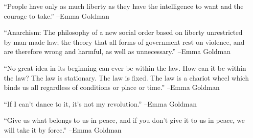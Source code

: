 \documentclass{article}%
\begin{document}
\linebreak%
\vspace{1mm}%
\begin{minipage}{\textwidth}%
\flushleft%
“People have only as much liberty as they have the intelligence to want and the courage to take.”%
\linebreak%
\vspace{1mm}%
–Emma Goldman%
\linebreak%
\vspace{1mm}%
\end{minipage}%
\linebreak%
\vspace{1mm}%
\begin{minipage}{\textwidth}%
\flushleft%
“Anarchism: The philosophy of a new social order based on liberty unrestricted by man{-}made law; the theory that all forms of government rest on violence, and are therefore wrong and harmful, as well as unnecessary.”%
\linebreak%
\vspace{1mm}%
–Emma Goldman%
\linebreak%
\vspace{1mm}%
\end{minipage}%
\linebreak%
\vspace{1mm}%
\begin{minipage}{\textwidth}%
\flushleft%
“No great idea in its beginning can ever be within the law. How can it be within the law? The law is stationary. The law is fixed. The law is a chariot wheel which binds us all regardless of conditions or place or time.”%
\linebreak%
\vspace{1mm}%
–Emma Goldman%
\linebreak%
\vspace{1mm}%
\end{minipage}%
\linebreak%
\vspace{1mm}%
\begin{minipage}{\textwidth}%
\flushleft%
“If I can't dance to it, it's not my revolution.”%
\linebreak%
\vspace{1mm}%
–Emma Goldman%
\linebreak%
\vspace{1mm}%
\end{minipage}%
\linebreak%
\vspace{1mm}%
\begin{minipage}{\textwidth}%
\flushleft%
“Give us what belongs to us in peace, and if you don't give it to us in peace, we will take it by force.”%
\linebreak%
\vspace{1mm}%
–Emma Goldman%
\linebreak%
\vspace{1mm}%
\end{minipage}%
\end{document}
